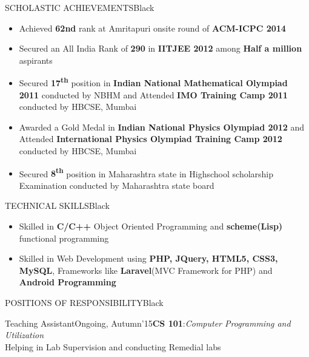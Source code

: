 \documentclass[11pt,a4paper]{article} %
\begin{document}
\begin{ressection}{SCHOLASTIC ACHIEVEMENTS}{Black}

\begin{itemize}
\itemsep-0.1em
\item Achieved \textbf{62nd} rank at Amritapuri onsite round of \textbf{ACM-ICPC 2014}
\item Secured an All India Rank of {\bf 290} in {\bf IITJEE 2012} among {\bf Half a million} aspirants
\item Secured {\bf 17\textsuperscript{th}} position in {\bf Indian National Mathematical Olympiad 2011} conducted by NBHM and Attended {\bf IMO Training Camp 2011} conducted by HBCSE, Mumbai
\item Awarded a Gold Medal in {\bf Indian National Physics Olympiad 2012} and Attended {\bf International Physics Olympiad Training Camp 2012} conducted by HBCSE, Mumbai
\item Secured {\bf 8\textsuperscript{th}} position in Maharashtra state in Highschool scholarship Examination conducted by Maharashtra 
state board
\end{itemize}

\end{ressection}


\begin{ressection}{TECHNICAL SKILLS}{Black}

\begin{itemize}
\itemsep 0.1em
\item Skilled in \textbf{C/C++} Object Oriented Programming and \textbf{scheme(Lisp)} functional programming
\item Skilled in Web Development using \textbf{PHP, JQuery, HTML5, CSS3, MySQL}, Frameworks like \textbf{Laravel}(MVC Framework for PHP) and \textbf{Android Programming}
\end{itemize}

\end{ressection}

\begin{ressection}{POSITIONS OF RESPONSIBILITY}{Black}

\begin{ressubsection}{Teaching Assistant}{Ongoing, Autumn'15}{\textbf{CS 101}:\textit{Computer Programming and Utilization}\\ Helping in Lab Supervision and conducting Remedial labs}\\

\end{ressubsection}
\end{ressection}
\end{document}
